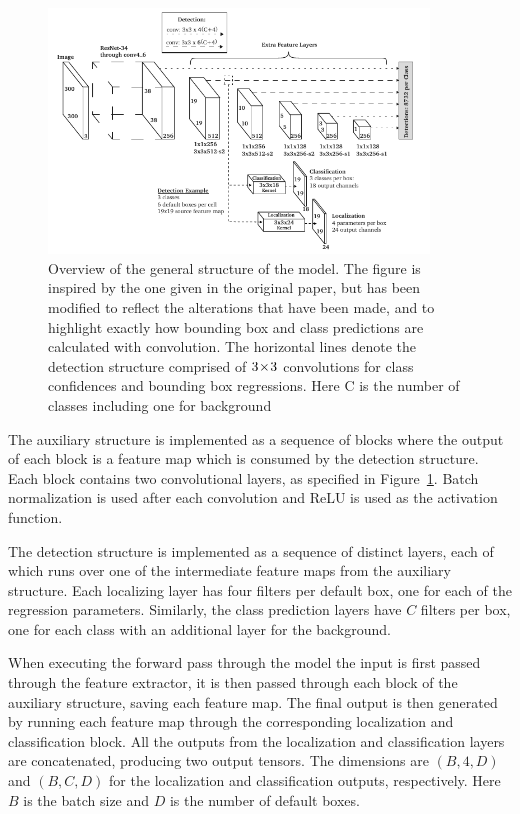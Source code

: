\begin{figure}[htb]
  \centering
  \includegraphics[width=0.9\textwidth]{figs/method/model.pdf}
  \caption[Model architecture overview]{Overview of the general structure of the model.
The figure is inspired by the one given in the original paper, but has been modified to reflect the alterations that have been made, and to highlight exactly how bounding box and class predictions are calculated with convolution.
The horizontal lines denote the detection structure comprised of \(3\!\times \! 3\) convolutions for class confidences and bounding box regressions.
Here \textsf{C} is the number of classes including one for background}\label{fig:model}
\end{figure}
The auxiliary structure is implemented as a sequence of blocks where the output of each block is a feature map which is consumed by the detection structure.
Each block contains two convolutional layers, as specified in Figure~\ref{fig:model}.
Batch normalization is used after each convolution and ReLU is used as the activation function.

The detection structure is implemented as a sequence of distinct layers, each of which runs over one of the intermediate feature maps from the auxiliary structure.
Each localizing layer has four filters per default box, one for each of the regression parameters.
Similarly, the class prediction layers have \(C\) filters per box, one for each class with an additional layer for the background.

When executing the forward pass through the model the input is first passed through the feature extractor, it is then passed through each block of the auxiliary structure, saving each feature map.
The final output is then generated by running each feature map through the corresponding localization and classification block.
All the outputs from the localization and classification layers are concatenated, producing two output tensors.
The dimensions are \(\left(B,4,D\right) \) and \(\left(B,C,D\right) \) for the localization and classification outputs, respectively.
Here \(B\) is the batch size and \(D\) is the number of default boxes.

